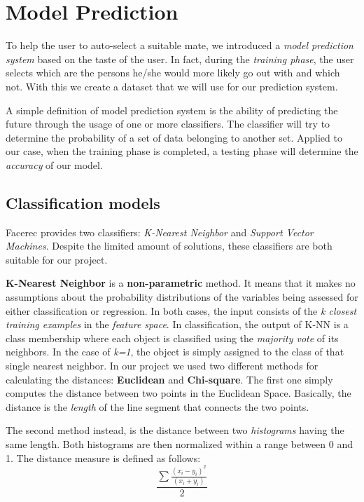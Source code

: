 \documentclass{report}
\begin{document}
\chapter{Model Prediction}
To help the user to auto-select a suitable mate, we introduced a \textit{model prediction system} based on the taste of the user. In fact, during the \textit{training phase}, the user selects which are the persons he/she would more likely go out with and which not. With this we create a dataset that we will use for our prediction system.

A simple definition of model prediction system is the ability of predicting the future through the usage of one or more classifiers. The classifier will try to determine the probability of a set of data belonging to another set. Applied to our case, when the training phase is completed, a testing phase will determine the \textit{accuracy} of our model.

\section{Classification models}
\label{sec:models}
Facerec provides two classifiers: \textit{K-Nearest Neighbor} and \textit{Support Vector Machines}. Despite the limited amount of solutions, these classifiers are both suitable for our project.

\textbf{K-Nearest Neighbor} is a \textbf{non-parametric} method. It means that it makes no assumptions about the probability distributions of the variables being assessed for either classification or regression.
In both cases, the input consists of the \textit{k closest training examples} in the \textit{feature space}. In classification, the output of K-NN is a class membership where each object is classified using the \textit{majority vote} of its neighbors.
In the case of \textit{k=1}, the object is simply assigned to the class of that single nearest neighbor.
In our project we used two different methods for calculating the distances: \textbf{Euclidean} and \textbf{Chi-square}.
The first one simply computes the distance between two points in the Euclidean Space. Basically, the distance is the \textit{length} of the line segment that connects the two points.

The second method instead, is the distance between two \textit{histograms} having the same length. Both histograms are then normalized within a range between 0 and 1. The distance measure is defined as follows:
\begin{equation}
  \frac{ \sum \frac{(x_i - y_i)^{2}}{(x_i+y_i)}}{2}
\end{equation}
\end{document}
